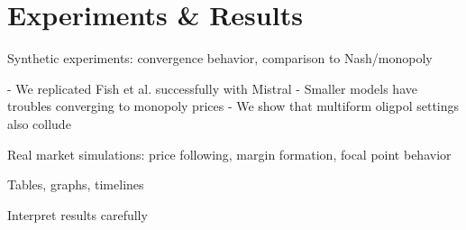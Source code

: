 \section{Experiments \& Results}\label{sec:res}

Synthetic experiments: convergence behavior, comparison to Nash/monopoly

- We replicated Fish et al. successfully with Mistral
- Smaller models have troubles converging to monopoly prices
- We show that multiform oligpol settings also collude



Real market simulations: price following, margin formation, focal point behavior

Tables, graphs, timelines

Interpret results carefully